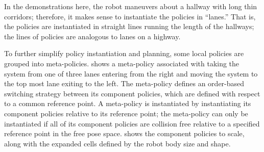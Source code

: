 In the demonstrations here, the robot maneuvers about a hallway with
long thin corridors; therefore, it makes sense to instantiate the
policies in ``lanes.''  That is, the policies are instantiated in
straight lines running the length of the hallways; the lines of
policies are analogous to lanes on a highway.  

To further simplify policy instantiation and planning, some local policies are
grouped into meta-policies.   shows a meta-policy associated
with taking the system from one of three lanes entering from the right and moving the
system to the top most lane exiting to the left.  The meta-policy defines an
order-based switching strategy between its component policies, which are defined with
respect to a common reference point.  %
A meta-policy is instantiated by instantiating its component policies relative to its
reference point; the meta-policy can only be instantiated if all of its component
policies are collision free relative to a specified reference point in the free pose
space.   shows the component policies to scale, along with the
expanded cells defined by the robot body size and shape.

